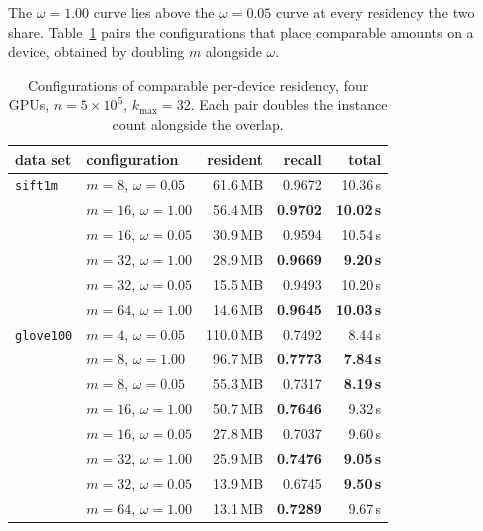 \documentclass{ieeeaccess}
\newcommand{\kmax}{k_{\max}}
\begin{document}
The $\omega = 1.00$ curve lies above the $\omega = 0.05$ curve at every
residency the two share. Table~\ref{tab:overlap} pairs the configurations that
place comparable amounts on a device, obtained by doubling $m$ alongside
$\omega$.

\begin{table}[!t]
\caption{Configurations of comparable per-device residency, four GPUs,
$n = 5\times10^5$, $\kmax = 32$. Each pair doubles the instance count alongside
the overlap.}
\label{tab:overlap}
\centering
\footnotesize
\begin{tabular}{@{}llrrr@{}}
\toprule
data set & configuration & resident & recall & total \\
\midrule
\texttt{sift1m}
  & $m = 8$, $\omega = 0.05$  & 61.6\,MB  & 0.9672 & 10.36\,s \\
  & $m = 16$, $\omega = 1.00$ & 56.4\,MB  & \textbf{0.9702} & \textbf{10.02\,s} \\
\addlinespace[1pt]
  & $m = 16$, $\omega = 0.05$ & 30.9\,MB  & 0.9594 & 10.54\,s \\
  & $m = 32$, $\omega = 1.00$ & 28.9\,MB  & \textbf{0.9669} & \textbf{9.20\,s} \\
\addlinespace[1pt]
  & $m = 32$, $\omega = 0.05$ & 15.5\,MB  & 0.9493 & 10.20\,s \\
  & $m = 64$, $\omega = 1.00$ & 14.6\,MB  & \textbf{0.9645} & \textbf{10.03\,s} \\
\midrule
\texttt{glove100}
  & $m = 4$, $\omega = 0.05$  & 110.0\,MB & 0.7492 & 8.44\,s \\
  & $m = 8$, $\omega = 1.00$  & 96.7\,MB  & \textbf{0.7773} & \textbf{7.84\,s} \\
\addlinespace[1pt]
  & $m = 8$, $\omega = 0.05$  & 55.3\,MB  & 0.7317 & \textbf{8.19\,s} \\
  & $m = 16$, $\omega = 1.00$ & 50.7\,MB  & \textbf{0.7646} & 9.32\,s \\
\addlinespace[1pt]
  & $m = 16$, $\omega = 0.05$ & 27.8\,MB  & 0.7037 & 9.60\,s \\
  & $m = 32$, $\omega = 1.00$ & 25.9\,MB  & \textbf{0.7476} & \textbf{9.05\,s} \\
\addlinespace[1pt]
  & $m = 32$, $\omega = 0.05$ & 13.9\,MB  & 0.6745 & \textbf{9.50\,s} \\
  & $m = 64$, $\omega = 1.00$ & 13.1\,MB  & \textbf{0.7289} & 9.67\,s \\
\bottomrule
\end{tabular}
\end{table}
\end{document}
